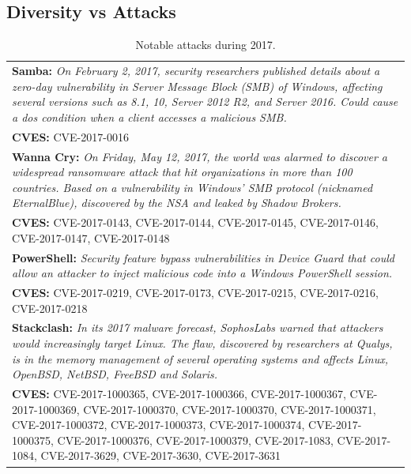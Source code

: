 \subsection*{Diversity vs Attacks}

\begin{table}[t]
\begin{center}
{%
\footnotesize
\begin{tabular}{ | p{} | }\hline

\textbf{Samba:} 
\emph{On February 2, 2017, security researchers published details about a zero-day vulnerability in Server Message Block (SMB) of Windows, affecting several versions such as 8.1, 10, Server 2012 R2, and Server 2016. 
Could cause a \gls{dos} condition when a client accesses a malicious SMB.}\\
\textbf{CVES:} 
CVE-2017-0016
\\ \hline

\textbf{Wanna Cry:} 
\emph{On Friday, May 12, 2017, the world was alarmed to discover a widespread ransomware attack that hit organizations in more than 100 countries. Based on a vulnerability in Windows' SMB protocol (nicknamed EternalBlue), discovered by the NSA and leaked by Shadow Brokers.} \\
\textbf{CVES:} 
CVE-2017-0143, CVE-2017-0144, CVE-2017-0145, CVE-2017-0146, CVE-2017-0147, CVE-2017-0148 \\ \hline

\textbf{PowerShell:} 
\emph{Security feature bypass vulnerabilities in Device Guard that could allow an attacker to inject malicious code into a Windows PowerShell session.} \\
\textbf{CVES:}
CVE-2017-0219, CVE-2017-0173, CVE-2017-0215, CVE-2017-0216, CVE-2017-0218\\ \hline

\textbf{Stackclash:} 
\emph{In its 2017 malware forecast, SophosLabs warned that attackers would increasingly target Linux. The flaw, discovered by researchers at Qualys, is in the memory management of several operating systems and affects Linux, OpenBSD, NetBSD, FreeBSD and Solaris.}\\
\textbf{CVES:}
CVE-2017-1000365, CVE-2017-1000366, CVE-2017-1000367, CVE-2017-1000369, CVE-2017-1000370, CVE-2017-1000370, CVE-2017-1000371, CVE-2017-1000372, CVE-2017-1000373, CVE-2017-1000374, CVE-2017-1000375, CVE-2017-1000376, CVE-2017-1000379, CVE-2017-1083, CVE-2017-1084, CVE-2017-3629, CVE-2017-3630, CVE-2017-3631\\ \hline

\end{tabular}
}
\caption{Notable attacks during 2017.}
\label{tab:special_vulns}
\end{center}
\end{table}

